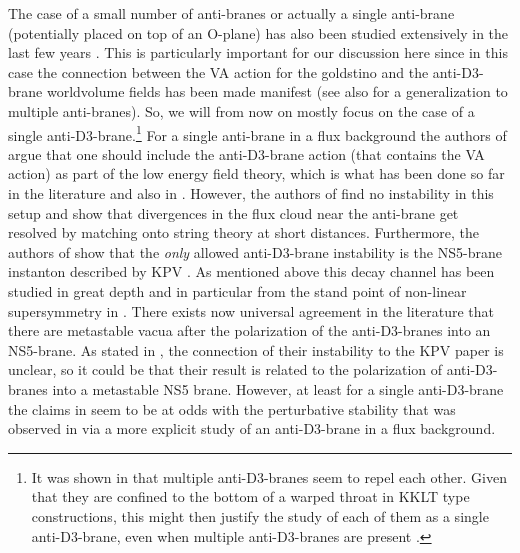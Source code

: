 \documentclass[11pt]{article}
\begin{document}
The case of a small number of anti-branes or actually a single anti-brane (potentially placed on top of an O-plane) has also been studied extensively in the last few years \cite{Michel:2014lva, Kallosh:2014wsa, Bergshoeff:2015jxa, Kallosh:2015nia, Bandos:2015xnf, Garcia-Etxebarria:2015lif, Dasgupta:2016prs, Vercnocke:2016fbt, Kallosh:2016aep, Bandos:2016xyu, Aalsma:2017ulu, GarciadelMoral:2017vnz, Aalsma:2018pll, Cribiori:2019hod}. This is particularly important for our discussion here since in this case the connection between the VA action for the goldstino and the anti-D3-brane worldvolume fields has been made manifest (see also \cite{Parameswaran:2020ukp} for a generalization to multiple anti-branes). So, we will from now on mostly focus on the case of a single anti-D3-brane.\footnote{It was shown in \cite{Bena:2014jaa} that multiple anti-D3-branes seem to repel each other. Given that they are confined to the bottom of a warped throat in KKLT type constructions, this might then justify the study of each of them as a single anti-D3-brane, even when multiple anti-D3-branes are present \cite{Michel:2014lva}.} For a single anti-brane in a flux background the authors of \cite{Michel:2014lva} argue that one should include the anti-D3-brane action (that contains the VA action) as part of the low energy field theory, which is what has been done so far in the literature and also in \cite{DallAgata:2022abm}. However, the authors of \cite{Michel:2014lva} find no instability in this setup and show that divergences in the flux cloud near the anti-brane get resolved by matching onto string theory at short distances. Furthermore, the authors of \cite{Michel:2014lva} show that the \emph{only} allowed anti-D3-brane instability is the NS5-brane instanton described by KPV \cite{Kachru:2002gs}. As mentioned above this decay channel has been studied in great depth and in particular from the stand point of non-linear supersymmetry in \cite{Aalsma:2017ulu, Aalsma:2018pll}. There exists now universal agreement in the literature that there are metastable vacua after the polarization of the anti-D3-branes into an NS5-brane. As stated in \cite{DallAgata:2022abm}, the connection of their instability to the KPV paper is unclear, so it could be that their result is related to the polarization of anti-D3-branes into a metastable NS5 brane. However, at least for a single anti-D3-brane the claims in \cite{DallAgata:2022abm} seem to be at odds with the perturbative stability that was observed in \cite{Michel:2014lva} via a more explicit study of an anti-D3-brane in a flux background.
\end{document}
